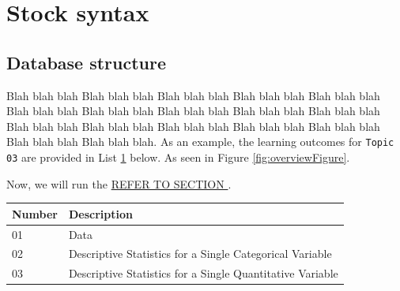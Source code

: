 \documentclass[11pt,a4paper,oldfontcommands,openany]{memoir}
\numberwithin{equation}{section} %
\begin{document}
\chapter{Stock syntax}
\section{Database structure}

Blah blah blah Blah blah blah Blah blah blah Blah blah blah Blah blah blah Blah blah blah Blah blah blah Blah blah blah Blah blah blah Blah blah blah Blah blah blah Blah blah blah Blah blah blah Blah blah blah Blah blah blah Blah blah blah Blah blah blah. As an example, the learning outcomes for \texttt{Topic 03} are provided in List \hyperref[sec:lo]{1} below.
As seen in Figure \ref{fig:overviewFigure}.

\begin{center}
\captionsetup{width=\textwidth}
\label{fig:overviewFigure}
\end{center}

Now, we will run the \hyperref[sec:helpSection]{REFER TO SECTION }.

\begin{center}
\label{tab:topics}
\begin{tabular} { | l | l | }
\hline \textbf{Number} & \textbf{Description} \\
\hline
01 & Data \\
\hline
02  & Descriptive Statistics for a Single Categorical Variable \\
\hline
03 & Descriptive Statistics for a Single Quantitative Variable \\
\hline
\end{tabular}
\end{center}
\end{document}
